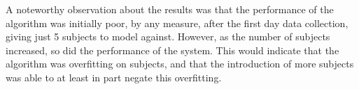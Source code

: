 A noteworthy observation about the results was that the performance of the algorithm was initially poor, by any measure, after the first day data collection, giving just 5  subjects to model against. However, as the number of subjects increased, so did the performance of the system. This would indicate that the algorithm was overfitting on subjects, and that the introduction of more subjects was able to at least in part negate this overfitting.

